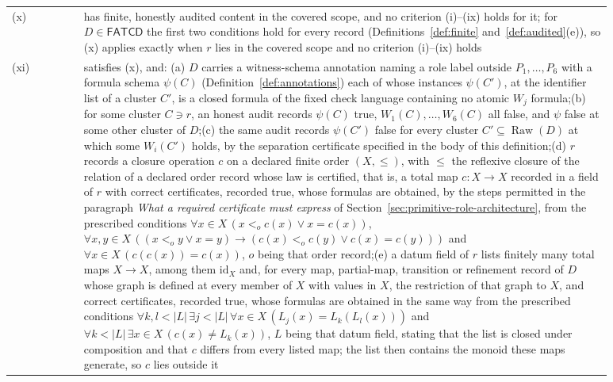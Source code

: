 \documentclass[11pt]{article}
\theoremstyle{definition}
\newcommand{\FATCD}{\ensuremath{\mathsf{FATCD}}}
\newcommand{\Raw}[1]{\ensuremath{\operatorname{Raw}\!\left(#1\right)}}
\begin{document}
\begin{longtable}{@{}l>{\raggedright\arraybackslash}p{0.88\linewidth}@{}}
(x) & has finite, honestly audited content in the covered scope, and no criterion (i)--(ix) holds for it; for \(D\in\FATCD{}\) the first two conditions hold for every record (Definitions~\ref{def:finite} and~\ref{def:audited}(e)), so (x) applies exactly when \(r\) lies in the covered scope and no criterion (i)--(ix) holds \\
(xi) & satisfies (x), and: (a) \(D\) carries a witness-schema annotation naming a role label outside \(P_1,\dots,P_6\) with a formula schema \(\psi(C)\) (Definition~\ref{def:annotations}) each of whose instances \(\psi(C')\), at the identifier list of a cluster \(C'\), is a closed formula of the fixed check language containing no atomic \(W_j\) formula;\newline (b) for some cluster \(C\ni r\), an honest audit records \(\psi(C)\) true, \(W_1(C),\dots,W_6(C)\) all false, and \(\psi\) false at some other cluster of \(D\);\newline (c) the same audit records \(\psi(C')\) false for every cluster \(C'\subseteq\Raw{D}\) at which some \(W_i(C')\) holds, by the separation certificate specified in the body of this definition;\newline (d) \(r\) records a closure operation \(c\) on a declared finite order \((X,\le)\), with \(\le\) the reflexive closure of the relation of a declared order record whose law is certified, that is, a total map \(c:X\to X\) recorded in a field of \(r\) with correct certificates, recorded true, whose formulas are obtained, by the steps permitted in the paragraph \emph{What a required certificate must express} of Section~\ref{sec:primitive-role-architecture}, from the prescribed conditions \(\forall x\in X\,(x<_o c(x)\vee x=c(x))\), \(\forall x,y\in X\,((x<_o y\vee x=y)\to(c(x)<_o c(y)\vee c(x)=c(y)))\) and \(\forall x\in X\,(c(c(x))=c(x))\), \(o\) being that order record;\newline (e) a datum field of \(r\) lists finitely many total maps \(X\to X\), among them \(\mathrm{id}_X\) and, for every map, partial-map, transition or refinement record of \(D\) whose graph is defined at every member of \(X\) with values in \(X\), the restriction of that graph to \(X\), and correct certificates, recorded true, whose formulas are obtained in the same way from the prescribed conditions \(\forall k,l<|L|\,\exists j<|L|\,\forall x\in X\,(L_j(x)=L_k(L_l(x)))\) and \(\forall k<|L|\,\exists x\in X\,(c(x)\neq L_k(x))\), \(L\) being that datum field, stating that the list is closed under composition and that \(c\) differs from every listed map; the list then contains the monoid these maps generate, so \(c\) lies outside it \\
\bottomrule
\end{longtable}
\endgroup
\end{document}
